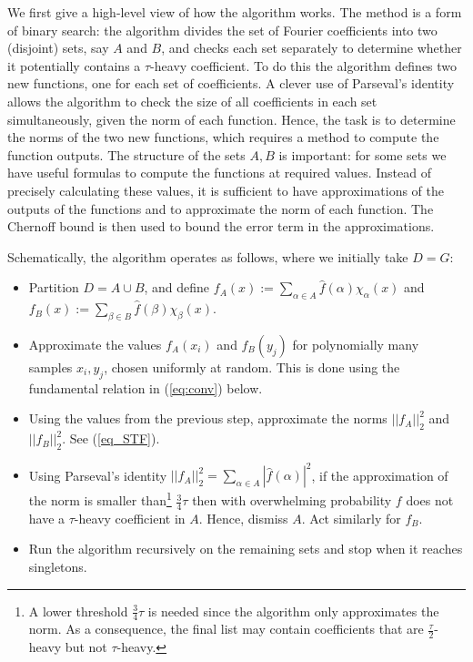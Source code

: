 \documentclass[11pt]{article}
\theoremstyle{definition}
\begin{document}
We first give a high-level view of how the algorithm works. The method is a form of binary search: the algorithm divides the set of Fourier coefficients into two (disjoint) sets, say $A$ and $B$, and checks each set separately to determine whether it potentially contains a $\tau$-heavy coefficient. To do this the algorithm defines two new functions, one for each set of coefficients.
A clever use of Parseval's identity allows the algorithm to check the size of all coefficients in each set simultaneously, given the norm of each function.
Hence, the task is to determine the norms of the two new functions, which requires a method to compute the function outputs.
The structure of the sets $A,B$ is important: for some sets we have useful formulas to compute the functions at required values.
Instead of precisely calculating these values, it is sufficient to have approximations of the outputs of the functions and to approximate the norm of each function. The Chernoff bound is then used to bound the error term in the approximations.

Schematically, the algorithm operates as follows, where we initially take $D = G$:
\begin{itemize}
    \item Partition $D = A \cup B$, and define $f_A(x) := \sum_{\alpha \in A} \widehat{f}(\alpha)\chi_\alpha(x)$ and $f_B(x) := \sum_{\beta \in B} \widehat{f}(\beta)\chi_\beta(x)$.
    \item Approximate the values $f_A(x_i)$ and $f_B(y_j)$ for polynomially many samples $x_i, y_j$, chosen uniformly at random. This is done using the fundamental relation in (\ref{eq:conv}) below.
    \item Using the values from the previous step, approximate the norms $||f_A||_2^2$ and $||f_B||_2^2$. See (\ref{eq_STF}).
    \item Using Parseval's identity $||f_A||_2^2 = \sum_{\alpha \in A} |\widehat{f}(\alpha)|^2$, if the approximation of the norm is smaller than\footnote{A lower threshold $\frac{3}{4}\tau$ is needed since the algorithm only approximates the norm. As a consequence, the final list may contain coefficients that are $\frac{\tau}{2}$-heavy but not $\tau$-heavy.} $\frac{3}{4}\tau$ then with overwhelming probability $f$ does not have a $\tau$-heavy coefficient in $A$. Hence, dismiss $A$. Act similarly for $f_B$.
    \item Run the algorithm recursively on the remaining sets and stop when it reaches singletons.
\end{itemize}
\end{document}
